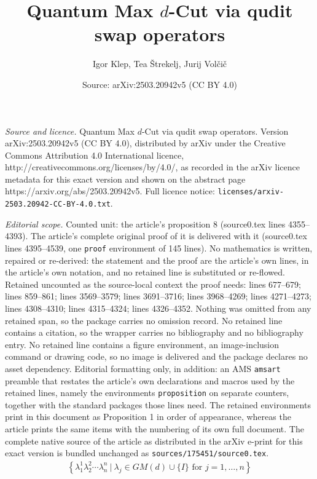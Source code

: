 \documentclass[10pt,a4paper]{amsart}
\title{Quantum Max $d$-Cut via qudit swap operators}
\author{Igor Klep, Tea \v{S}trekelj, Jurij Vol\v{c}i\v{c}}
\date{Source: arXiv:2503.20942v5 (CC BY 4.0)}
\begin{document}
\maketitle

\noindent\emph{Source and licence.} Quantum Max $d$-Cut via qudit swap operators. Version arXiv:2503.20942v5 (CC BY 4.0), distributed by arXiv under the Creative Commons Attribution 4.0 International licence, http://creativecommons.org/licenses/by/4.0/, as recorded in the arXiv licence metadata for this exact version and shown on the abstract page https://arxiv.org/abs/2503.20942v5. Full licence notice: \texttt{licenses/arxiv-2503.20942-CC-BY-4.0.txt}.\par\smallskip

\noindent\textit{Editorial scope.} Counted unit: the article's proposition 8 (source0.tex lines 4355--4393). The article's complete original proof of it is delivered with it (source0.tex lines 4395--4539, one \texttt{proof} environment of 145 lines). No mathematics is written, repaired or re-derived: the statement and the proof are the article's own lines, in the article's own notation, and no retained line is substituted or re-flowed.  Retained uncounted as the source-local context the proof needs: lines 677--679; lines 859--861; lines 3569--3579; lines 3691--3716; lines 3968--4269; lines 4271--4273; lines 4308--4310; lines 4315--4324; lines 4326--4352.  Nothing was omitted from any retained span, so the package carries no omission record.  No retained line contains a citation, so the wrapper carries no bibliography and no bibliography entry.  No retained line contains a figure environment, an image-inclusion command or drawing code, so no image is delivered and the package declares no asset dependency.  Editorial formatting only, in addition: an AMS \texttt{amsart} preamble that restates the article's own declarations and macros used by the retained lines, namely the environments \texttt{proposition} on separate counters, together with the standard packages those lines need.  The retained environments print in this document as Proposition 1 in order of appearance, whereas the article prints the same items with the numbering of its own full document.  The complete native source of the article as distributed in the arXiv e-print for this exact version is bundled unchanged as \texttt{sources/175451/source0.tex}.
\begin{align}\label{eq: basis-gm d}
	\left\{\lambda_{1}^1 \lambda_{2}^2 \cdots \lambda_{n}^n \ | \ \lambda_{j} \in GM(d)\cup\{I\}\text{ for }  j=1,\ldots,n\right\}
\end{align}
\end{document}
